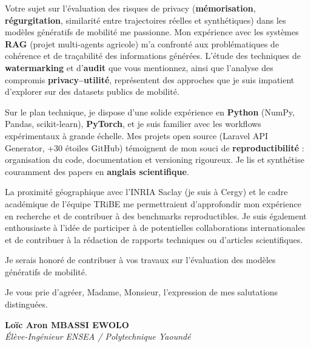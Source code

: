 \documentclass[a4paper,11pt]{article}
\begin{document}
Votre sujet sur l'évaluation des risques de privacy (\textbf{mémorisation}, \textbf{régurgitation}, similarité entre trajectoires réelles et synthétiques) dans les modèles génératifs de mobilité me passionne. Mon expérience avec les systèmes \textbf{RAG} (projet multi-agents agricole) m'a confronté aux problématiques de cohérence et de traçabilité des informations générées. L'étude des techniques de \textbf{watermarking} et d'\textbf{audit} que vous mentionnez, ainsi que l'analyse des compromis \textbf{privacy--utilité}, représentent des approches que je suis impatient d'explorer sur des datasets publics de mobilité.

Sur le plan technique, je dispose d'une solide expérience en \textbf{Python} (NumPy, Pandas, scikit-learn), \textbf{PyTorch}, et je suis familier avec les workflows expérimentaux à grande échelle. Mes projets open source (Laravel API Generator, +30 étoiles GitHub) témoignent de mon souci de \textbf{reproductibilité} : organisation du code, documentation et versioning rigoureux. Je lis et synthétise couramment des papers en \textbf{anglais scientifique}.

La proximité géographique avec l'INRIA Saclay (je suis à Cergy) et le cadre académique de l'équipe TRiBE me permettraient d'approfondir mon expérience en recherche et de contribuer à des benchmarks reproductibles. Je suis également enthousiaste à l'idée de participer à de potentielles collaborations internationales et de contribuer à la rédaction de rapports techniques ou d'articles scientifiques.

Je serais honoré de contribuer à vos travaux sur l'évaluation des modèles génératifs de mobilité.

Je vous prie d'agréer, Madame, Monsieur, l'expression de mes salutations distinguées.

\vspace{0.8cm}

\textbf{Loïc Aron MBASSI EWOLO}\\
\textit{Élève-Ingénieur ENSEA / Polytechnique Yaoundé}
\end{document}
